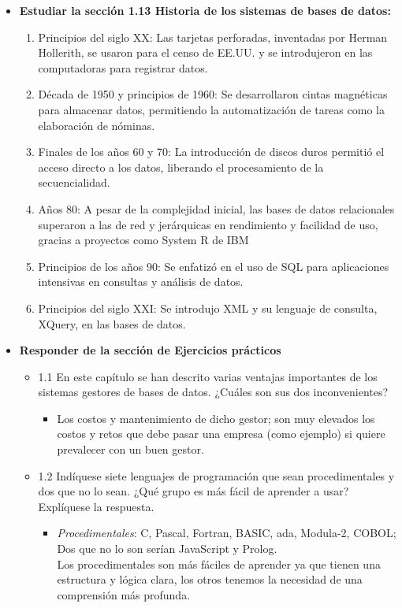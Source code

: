 \documentclass[letterpaper,12pt]{article}
\begin{document}
\begin{sloppypar}
\begin{itemize}
    \item \textbf{Estudiar la sección 1.13 Historia de los sistemas de bases de datos:} 
    \begin{enumerate}
        \item Principios del siglo XX: Las tarjetas perforadas, inventadas por Herman Hollerith, se usaron para el censo de EE.UU. y se introdujeron en las computadoras para registrar datos.
        \item Década de 1950 y principios de 1960: Se desarrollaron cintas magnéticas para almacenar datos, permitiendo la automatización de tareas como la elaboración de nóminas.
        \item Finales de los años 60 y 70: La introducción de discos duros permitió el acceso directo a los datos, liberando el procesamiento de la secuencialidad. 
        \item Años 80: A pesar de la complejidad inicial, las bases de datos relacionales superaron a las de red y jerárquicas en rendimiento y facilidad de uso, gracias a proyectos como System R de IBM
        \item Principios de los años 90: Se enfatizó en el uso de SQL para aplicaciones intensivas en consultas y análisis de datos.
        \item Principios del siglo XXI: Se introdujo XML y su lenguaje de consulta, XQuery, en las bases de datos. 
    \end{enumerate}
    \newpage
    \item \textbf{Responder de la sección de Ejercicios prácticos}
    \begin{itemize}
        \item 1.1 En este capítulo se han descrito varias ventajas importantes de los sistemas gestores de bases de datos. ¿Cuáles son sus dos inconvenientes?
        \begin{itemize}
            \item Los costos y mantenimiento de dicho gestor; son muy elevados los costos y retos que debe pasar una empresa (como ejemplo) si quiere prevalecer con un buen gestor.
        \end{itemize}
        \item 1.2 Indíquese siete lenguajes de programación que sean procedimentales y dos que no lo sean. ¿Qué grupo es más fácil de aprender a usar? Explíquese la respuesta.
        \begin{itemize}
            \item \textit{Procedimentales}: C, Pascal, Fortran, BASIC, ada, Modula-2, COBOL; Dos que no lo son serían JavaScript y Prolog. \\ Los procedimentales son más fáciles de aprender ya que tienen una estructura y lógica clara, los otros tenemos la necesidad de una comprensión más profunda.

\end{itemize}
\end{itemize}
\end{itemize}
\end{sloppypar}
\end{document}
